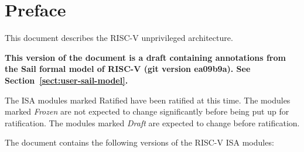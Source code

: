 \chapter{Preface}

This document describes the RISC-V unprivileged architecture.

\begin{addformalcomment}
\textbf{This version of the document is a draft containing annotations
  from the Sail formal model of RISC-V (git version ea09b9a).  See
  Section~\ref{sect:user-sail-model}.}
\end{addformalcomment}

The ISA modules marked Ratified have been ratified at this time.  The modules
marked {\em Frozen} are not expected to change significantly before being put
up for ratification.  The modules marked {\em Draft} are expected to change
before ratification.

The document contains the following versions of the RISC-V ISA modules:

